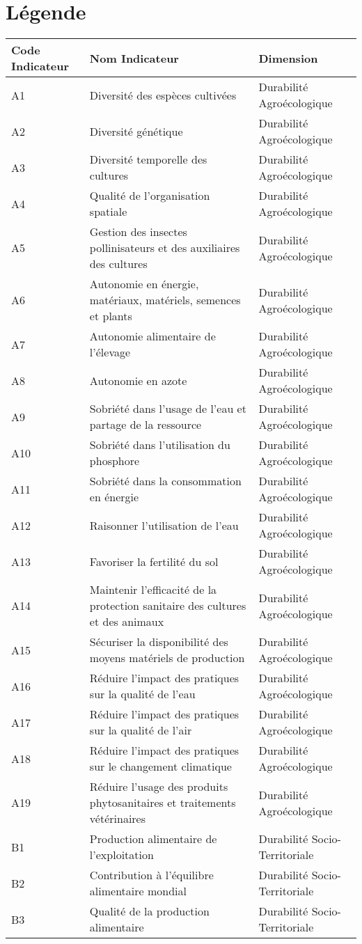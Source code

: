 \documentclass[13pt,]{article}
\begin{document}
\newpage

\hypertarget{legende}{%
\section{Légende}\label{legende}}

\footnotesize

\begin{longtable}[]{@{}lll@{}}
\toprule
Code Indicateur & Nom Indicateur & Dimension\tabularnewline
\midrule
\endhead
A1 & Diversité des espèces cultivées & Durabilité
Agroécologique\tabularnewline
A2 & Diversité génétique & Durabilité Agroécologique\tabularnewline
A3 & Diversité temporelle des cultures & Durabilité
Agroécologique\tabularnewline
A4 & Qualité de l'organisation spatiale & Durabilité
Agroécologique\tabularnewline
A5 & Gestion des insectes pollinisateurs et des auxiliaires des cultures
& Durabilité Agroécologique\tabularnewline
A6 & Autonomie en énergie, matériaux, matériels, semences et plants &
Durabilité Agroécologique\tabularnewline
A7 & Autonomie alimentaire de l'élevage & Durabilité
Agroécologique\tabularnewline
A8 & Autonomie en azote & Durabilité Agroécologique\tabularnewline
A9 & Sobriété dans l'usage de l'eau et partage de la ressource &
Durabilité Agroécologique\tabularnewline
A10 & Sobriété dans l'utilisation du phosphore & Durabilité
Agroécologique\tabularnewline
A11 & Sobriété dans la consommation en énergie & Durabilité
Agroécologique\tabularnewline
A12 & Raisonner l'utilisation de l'eau & Durabilité
Agroécologique\tabularnewline
A13 & Favoriser la fertilité du sol & Durabilité
Agroécologique\tabularnewline
A14 & Maintenir l'efficacité de la protection sanitaire des cultures et
des animaux & Durabilité Agroécologique\tabularnewline
A15 & Sécuriser la disponibilité des moyens matériels de production &
Durabilité Agroécologique\tabularnewline
A16 & Réduire l'impact des pratiques sur la qualité de l'eau &
Durabilité Agroécologique\tabularnewline
A17 & Réduire l'impact des pratiques sur la qualité de l'air &
Durabilité Agroécologique\tabularnewline
A18 & Réduire l'impact des pratiques sur le changement climatique &
Durabilité Agroécologique\tabularnewline
A19 & Réduire l'usage des produits phytosanitaires et traitements
vétérinaires & Durabilité Agroécologique\tabularnewline
B1 & Production alimentaire de l'exploitation & Durabilité
Socio-Territoriale\tabularnewline
B2 & Contribution à l'équilibre alimentaire mondial & Durabilité
Socio-Territoriale\tabularnewline
B3 & Qualité de la production alimentaire & Durabilité
Socio-Territoriale\tabularnewline

\end{longtable}
\end{document}

